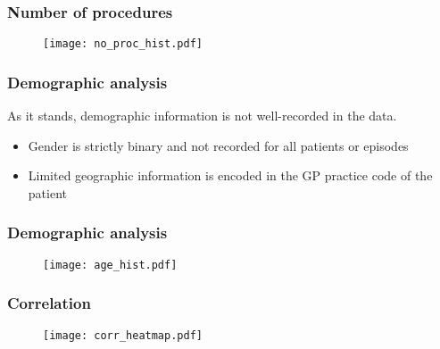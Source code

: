 \begin{frame}
    \frametitle{Number of procedures}

    \begin{figure}
    \texttt{[image: no\_proc\_hist.pdf]}
    \end{figure}
\end{frame}

\begin{frame}
    \frametitle{Demographic analysis}

    As it stands, demographic information is not well-recorded in the data.

    \vspace{10pt}
    \begin{itemize}
        \pause%
        \item Gender is strictly binary and not recorded for all patients or
            episodes
        \pause%
        \item Limited geographic information is encoded in the GP practice code
            of the patient
    \end{itemize}
\end{frame}

\begin{frame}
    \frametitle{Demographic analysis}

    \begin{figure}
    \texttt{[image: age\_hist.pdf]}
    \end{figure}
\end{frame}

\begin{frame}
    \frametitle{Correlation}

    \vspace{-15pt}
    \begin{figure}
    \texttt{[image: corr\_heatmap.pdf]}
    \end{figure}
\end{frame}
